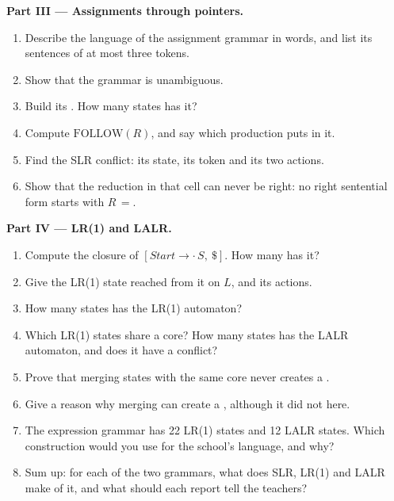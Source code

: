 \begin{problem}
\medskip\noindent\textbf{Part III --- Assignments through pointers.}
\begin{enumerate}[resume]
\item Describe the language of the assignment grammar in words, and list its sentences of at most three tokens.
\item Show that the grammar is unambiguous.
\item Build its . How many states has it?
\item Compute $\mathrm{FOLLOW}(R)$, and say which production puts \code{=} in it.
\item Find the SLR conflict: its state, its token and its two actions.
\item Show that the reduction in that cell can never be right: no right sentential form starts with $R\,=$.
\end{enumerate}

\medskip\noindent\textbf{Part IV --- LR(1) and LALR.}
\begin{enumerate}[resume]
\item Compute the closure of $[\mathit{Start} \to \cdot\,S,\ \$]$. How many  has it?
\item Give the LR(1) state reached from it on $L$, and its actions.
\item How many states has the LR(1) automaton?
\item Which LR(1) states share a core? How many states has the LALR automaton, and does it have a conflict?
\item Prove that merging states with the same core never creates a .
\item Give a reason why merging can create a , although it did not here.
\item The expression grammar has 22 LR(1) states and 12 LALR states. Which construction would you use for the school's language, and why?
\item Sum up: for each of the two grammars, what does SLR, LR(1) and LALR make of it, and what should each report tell the teachers?
\end{enumerate}
\end{problem}
